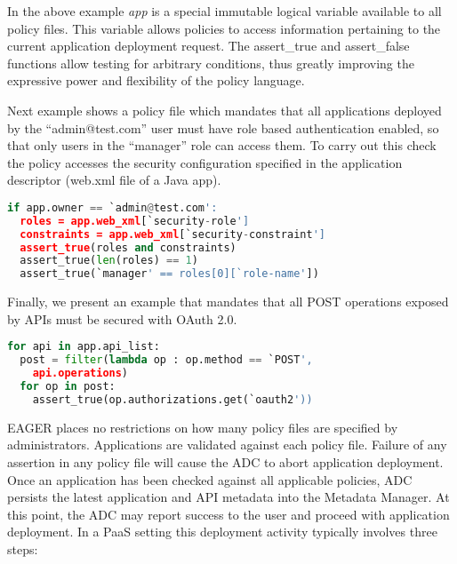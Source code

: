 In the above example \textit{app} is a special immutable logical variable available to
all policy files. This variable allows policies to access information
pertaining to the current application deployment request. The assert\_true and assert\_false
functions allow testing for arbitrary conditions, thus greatly improving the expressive
power and flexibility of the policy language.

Next example shows a policy file which mandates that all applications deployed
by the ``admin@test.com'' user must have role based authentication enabled, so that only
users in the ``manager'' role can access them. To carry out this check the policy accesses
the security configuration specified in the application descriptor (web.xml file of a Java app).

\vspace{0.05in}
{\footnotesize
\begin{lstlisting}[language=Python, frame=single, showstringspaces=false]
if app.owner == `admin@test.com':
  roles = app.web_xml[`security-role']
  constraints = app.web_xml[`security-constraint']
  assert_true(roles and constraints)
  assert_true(len(roles) == 1)
  assert_true(`manager' == roles[0][`role-name'])
\end{lstlisting}
}
\vspace{0.05in}

Finally, we present an example that mandates that all POST operations exposed by APIs must be
secured with OAuth 2.0.

\vspace{0.05in}
{\footnotesize
\begin{lstlisting}[language=Python, frame=single, showstringspaces=false]
for api in app.api_list:
  post = filter(lambda op : op.method == `POST', 
  	api.operations)
  for op in post:
    assert_true(op.authorizations.get(`oauth2'))
\end{lstlisting}
}
\vspace{0.05in}

EAGER places no restrictions on how many policy files are specified by 
administrators. Applications are validated against each policy file. Failure
of any assertion in any policy file will cause the ADC to abort 
application deployment. Once an application has been checked against all
applicable policies, ADC persists the latest application and API metadata into
the Metadata Manager.  At this point, the ADC may report success to the user
and proceed with application deployment. In a PaaS setting
this deployment activity typically involves three steps:

